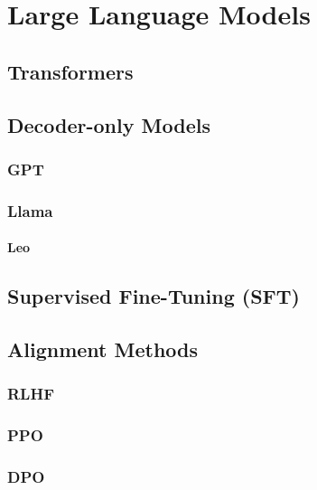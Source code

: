 \chapter{Large Language Models}\label{ch:techOverview}



\section{Transformers}\label{sec:trans}

\section{Decoder-only Models}\label{sec:decoder}

\subsection{GPT}\label{subsec:gpt}

\subsection{Llama}\label{subsec:llama}

\subsubsection{Leo}

\section{Supervised Fine-Tuning (SFT)}\label{sec:supervised-fine-tuning}

\section{Alignment Methods}\label{sec:alignment-methods}

\subsection{RLHF}\label{subsec:rlhf}
\subsection{PPO}\label{subsec:ppo}
\subsection{DPO}\label{subsec:dpo}
